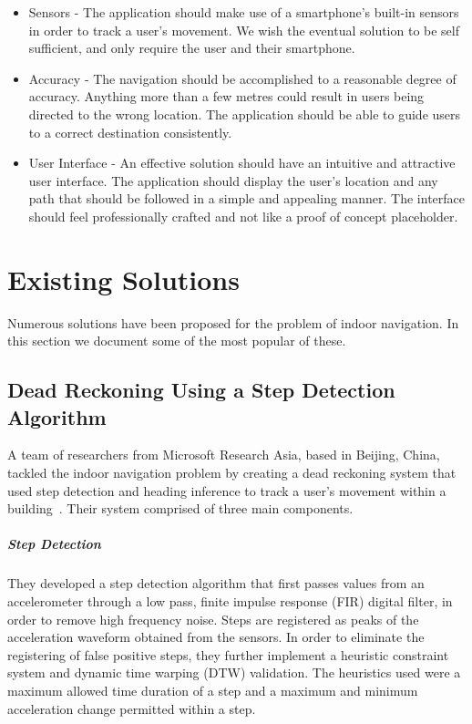 \documentclass[12pt,a4paper]{report}
\begin{document}
\begin{itemize}
\item Sensors - The application should make use of a smartphone's built-in sensors in order to track a user's movement. We wish the eventual solution to be self sufficient, and only require the user and their smartphone.

\item Accuracy - The navigation should be accomplished to a reasonable degree of accuracy. Anything more than a few metres could result in users being directed to the wrong location. The application should be able to guide users to a correct destination consistently.

\item User Interface - An effective solution should have an intuitive and attractive user interface. The application should display the user's location and any path that should be followed in a simple and appealing manner. The interface should feel professionally crafted and not like a proof of concept placeholder.

\end{itemize}

\chapter{Existing Solutions}

Numerous solutions have been proposed for the problem of indoor navigation. In this section we document some of the most popular of these.

\section{Dead Reckoning Using a Step Detection Algorithm}
\label{sec:drRes}
A team of researchers from Microsoft Research Asia, based in Beijing, China, tackled the indoor navigation problem by creating a dead reckoning system that used step detection and heading inference to track a user's movement within a building~\cite{li2012reliable}. Their system comprised of three main components.

\paragraph{Step Detection}
They developed a step detection algorithm that first passes values from an accelerometer through a low pass, finite impulse response (FIR) digital filter, in order to remove high frequency noise. Steps are registered as peaks of the acceleration waveform obtained from the sensors. In order to eliminate the registering of false positive steps, they further implement a heuristic constraint system and dynamic time warping (DTW) validation. The heuristics used were a maximum allowed time duration of a step and a maximum and minimum acceleration change permitted within a step. 
\end{document}
